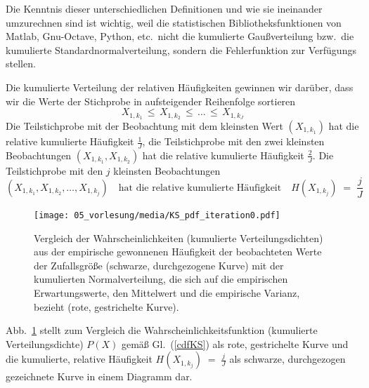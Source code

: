 Die Kenntnis dieser unterschiedlichen Definitionen und wie sie ineinander umzurechnen sind ist
wichtig, weil die statistischen Bibliotheksfunktionen von Matlab, Gnu-Octave, Python, etc.\
nicht die kumulierte Gaußverteilung bzw.\ die kumulierte Standardnormalverteilung, sondern die Fehlerfunktion
zur Verfügungs stellen.

Die kumulierte Verteilung der relativen Häufigkeiten gewinnen wir darüber, dass wir die Werte der
Stichprobe in aufsteigender Reihenfolge sortieren
\begin{equation}
X_{1,k_1} \, \leq \, X_{1,k_2} \, \leq \,  \dots \, \leq \,  X_{1,k_J}
\end{equation}
Die Teilstichprobe mit der Beobachtung mit dem kleinsten Wert $(X_{1,k_1})$ hat die
relative kumulierte Häufigkeit $\frac{1}{J}$, die Teilstichprobe mit den zwei
kleinsten Beobachtungen $(X_{1,k_1}, X_{1,k_2})$ hat die relative kumulierte Häufigkeit $\frac{2}{J}$.
Die Teilstichprobe mit den $j$ kleinsten Beobachtungen
\begin{equation}
(X_{1,k_1}, X_{1,k_2}, \dots, X_{1,k_j})
\quad \text{hat~die~relative~kumulierte~Häufigkeit}
\quad H(X_{1,k_j}) \; = \; \frac{j}{J}
\label{cdfH}
\end{equation}
\begin{figure}
\begin{center}
\texttt{[image: 05\_vorlesung/media/KS\_pdf\_iteration0.pdf]}
\caption{\label{cdf4KStest} Vergleich der Wahrscheinlichkeiten (kumulierte Verteilungsdichten) aus der
empirische gewonnenen Häufigkeit der beobachteten Werte der Zufallsgröße
(schwarze, durchgezogene Kurve) mit der kumulierten Normalverteilung, die sich auf
die empirischen Erwartungswerte, den Mittelwert und die empirische Varianz, bezieht (rote,
gestrichelte Kurve).}
\end{center}
\end{figure}

Abb.~\ref{cdf4KStest} stellt zum Vergleich die Wahrscheinlichkeitsfunktion
(kumulierte Verteilungsdichte) $P(X)$ gemäß Gl.~(\ref{cdfKS})
als rote, gestrichelte Kurve und die kumulierte, relative Häufigkeit
$H(X_{1,k_j}) \; = \; \frac{j}{J}$
als schwarze, durchgezogen gezeichnete Kurve in einem Diagramm dar.


